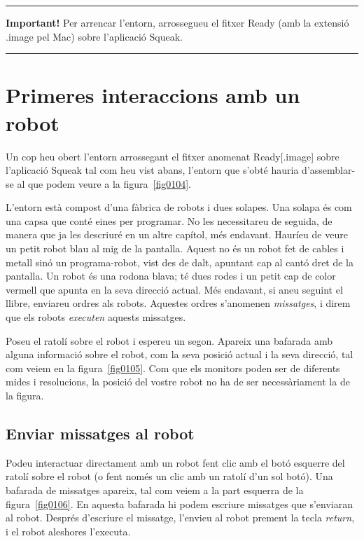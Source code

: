\vspace{3mm}
\noindent
\rule{\textwidth}{2pt}
\noindent
\textbf{Important!} Per arrencar l'entorn, arrossegueu el fitxer \textsf{Ready} (amb la extensió \textsf{.image}  pel Mac) sobre l'aplicació \textsf{Squeak}. \\
\noindent
\rule{\textwidth}{2pt}

\section{Primeres interaccions amb un robot}
Un cop heu obert l'entorn arrossegant el fitxer anomenat \textsf{Ready}[\textsf{.image}]  sobre l'aplicació \textsf{Squeak}  tal com heu vist abans, l'entorn que s'obté hauria d'assemblar-se al que podem veure a la figura~\ref{fig0104}.

L'entorn està compost d'una fàbrica de robots i dues solapes. Una solapa és com una capsa que conté eines per programar. No les necessitareu de seguida, de manera que ja les descriuré en un altre capítol, més endavant. Hauríeu de veure un petit robot blau al mig de la pantalla. Aquest no és un robot fet de cables i metall sinó un programa-robot, vist des de dalt, apuntant cap al cantó dret de la pantalla. Un robot és una rodona blava; té dues rodes i un petit cap de color vermell que apunta en la seva direcció actual. Més endavant, si aneu seguint el llibre, enviareu ordres als robots. Aquestes ordres s'anomenen \emph{missatges}, i direm que els robots \emph{executen} aquests missatges.  

Poseu el ratolí sobre el robot i espereu un segon. Apareix una bafarada amb alguna informació sobre el robot, com la seva posició actual i la seva direcció, tal com veiem en la figura~\ref{fig0105}. Com que els monitors poden ser de diferents mides i resolucions, la posició del vostre robot no ha de ser necessàriament la de la figura.   

\subsection{Enviar missatges al robot}
Podeu interactuar directament amb un robot fent clic amb el botó esquerre del ratolí sobre el robot (o fent només un clic amb un ratolí d'un sol botó). Una bafarada de missatges apareix, tal com veiem a la part esquerra de la figura~\ref{fig0106}. En aquesta bafarada hi podem escriure missatges que s'enviaran al robot. Després d'escriure el missatge, l'envieu al robot prement la tecla \emph{return}, i el robot aleshores l'executa.

